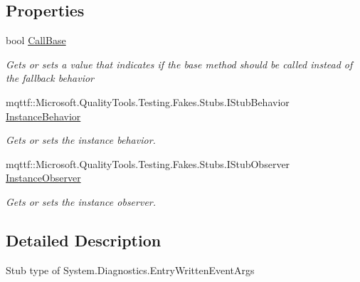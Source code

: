 \subsection*{Properties}
\begin{DoxyCompactItemize}
\item 
bool \hyperlink{class_system_1_1_diagnostics_1_1_fakes_1_1_stub_entry_written_event_args_a942e2dafd09f53cbb51842c56a7d10df}{Call\-Base}
\begin{DoxyCompactList}\small\item\em Gets or sets a value that indicates if the base method should be called instead of the fallback behavior\end{DoxyCompactList}\item 
mqttf\-::\-Microsoft.\-Quality\-Tools.\-Testing.\-Fakes.\-Stubs.\-I\-Stub\-Behavior \hyperlink{class_system_1_1_diagnostics_1_1_fakes_1_1_stub_entry_written_event_args_aacbfb10d03065a4371ca759840bfdb0f}{Instance\-Behavior}
\begin{DoxyCompactList}\small\item\em Gets or sets the instance behavior.\end{DoxyCompactList}\item 
mqttf\-::\-Microsoft.\-Quality\-Tools.\-Testing.\-Fakes.\-Stubs.\-I\-Stub\-Observer \hyperlink{class_system_1_1_diagnostics_1_1_fakes_1_1_stub_entry_written_event_args_a67ca002348e58eda7550b0063185d7be}{Instance\-Observer}
\begin{DoxyCompactList}\small\item\em Gets or sets the instance observer.\end{DoxyCompactList}\end{DoxyCompactItemize}


\subsection{Detailed Description}
Stub type of System.\-Diagnostics.\-Entry\-Written\-Event\-Args




